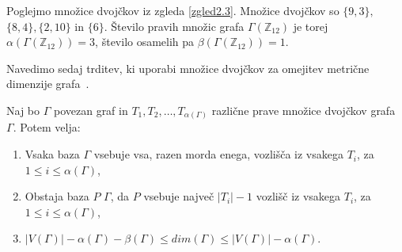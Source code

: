 \documentclass[mat1, tisk]{fmfdelo}
\newcommand{\Z}{\mathbb Z}
\begin{document}
%
\begin{zgled}
  Poglejmo množice dvojčkov iz zgleda \ref{zgled2.3}. Množice dvojčkov so 
  $\{9,3\},$ $\{8,4\},\{2,10\}$ in $\{6\}$. Število pravih množic grafa $\Gamma(\Z_{12})$ 
  je torej $\alpha(\Gamma(\Z_{12})) = 3$, število osamelih pa $\beta(\Gamma(\Z_{12})) = 1$.
\end{zgled}
%
Navedimo sedaj trditev, ki uporabi množice dvojčkov za omejitev metrične 
dimenzije grafa~\cite{3pirzada14}.
%
\begin{trditev}\label{trditev2.14}
  Naj bo $\Gamma$ povezan graf in $T_1, T_2, \ldots, T_{\alpha(\Gamma)}$ različne 
  prave množice dvojčkov grafa $\Gamma$. Potem velja:
  \begin{enumerate}[label=(\roman*)]
    \item Vsaka baza $\Gamma$ vsebuje vsa, razen morda enega, vozlišča iz 
          vsakega $T_i$, za $1 \leq i \leq \alpha(\Gamma)$,
    \item Obstaja baza $P$ $\Gamma$, da $P$ vsebuje največ $|T_i| - 1$ vozlišč 
          iz vsakega $T_i$, za $1 \leq i \leq \alpha(\Gamma)$,
    \item $|V(\Gamma)| - \alpha(\Gamma) - \beta(\Gamma) \leq dim(\Gamma) \leq |V(\Gamma)| - \alpha(\Gamma)$.
  \end{enumerate}
\end{trditev}
\end{document}
